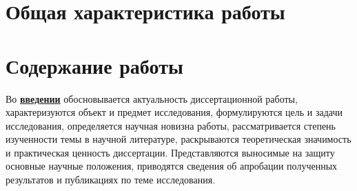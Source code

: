 
\section*{Общая характеристика работы}

\newcommand{\actuality}{\underline{\textbf{\actualityTXT}}}
\newcommand{\progress}{\underline{\textbf{\progressTXT}}}
\newcommand{\aim}{\underline{{\textbf\aimTXT}}}
\newcommand{\tasks}{\underline{\textbf{\tasksTXT}}}
\newcommand{\novelty}{\underline{\textbf{\noveltyTXT}}}
\newcommand{\influence}{\underline{\textbf{\influenceTXT}}}
\newcommand{\methods}{\underline{\textbf{\methodsTXT}}}
\newcommand{\defpositions}{\underline{\textbf{\defpositionsTXT}}}
\newcommand{\reliability}{\underline{\textbf{\reliabilityTXT}}}
\newcommand{\probation}{\underline{\textbf{\probationTXT}}}
\newcommand{\contribution}{\underline{\textbf{\contributionTXT}}}
\newcommand{\publications}{\underline{\textbf{\publicationsTXT}}}




\section*{Содержание работы}
Во \underline{\textbf{введении}} обосновывается актуальность диссертационной работы, характеризуются объект и предмет исследования,  формулируются цель и задачи исследования, определяется научная новизна работы, рассматривается степень изученности темы в научной литературе, раскрываются теоретическая значимость и практическая ценность диссертации. Представляются выносимые на защиту основные научные положения, приводятся сведения об апробации полученных результатов и публикациях по теме исследования.


